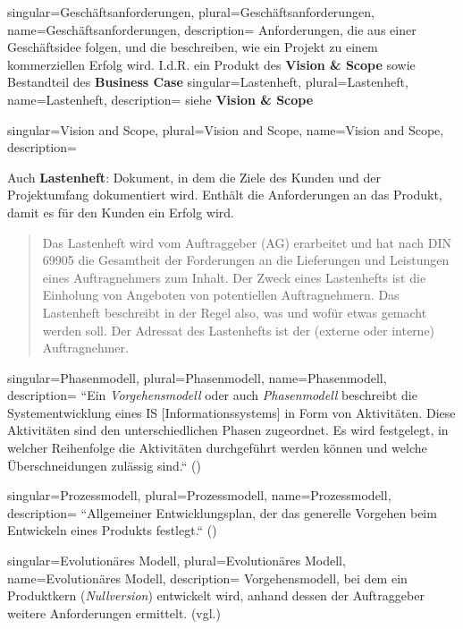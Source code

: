 {
singular={Geschäftsanforderungen},
plural={Geschäftsanforderungen},
name={Geschäftsanforderungen},
description={
Anforderungen, die aus einer Geschäftsidee folgen, und die beschreiben, wie ein Projekt zu einem kommerziellen Erfolg wird. I.d.R. ein Produkt des \textbf{Vision \& Scope} sowie Bestandteil des \textbf{Business Case}
}
}
{
singular={Lastenheft},
plural={Lastenheft},
name={Lastenheft},
description={
siehe \textbf{Vision \& Scope}
}
}


{
singular={Vision and Scope},
plural={Vision and Scope},
name={Vision and Scope},
description={
Auch \textbf{Lastenheft}: Dokument, in dem die Ziele des Kunden und der Projektumfang dokumentiert wird. Enthält die Anforderungen an das Produkt, damit es für den Kunden ein Erfolg wird.\\
\blockquote[{\cite[305]{AABG14m}}]{
Das Lastenheft wird vom Auftraggeber (AG) erarbeitet und hat
nach DIN 69905 die Gesamtheit der Forderungen an die Lieferungen und Leistungen eines Auftragnehmers zum Inhalt. Der Zweck eines Lastenhefts ist die Einholung von Angeboten von potentiellen Auftragnehmern. Das Lastenheft beschreibt
in der Regel also, was und wofür etwas gemacht werden soll. Der Adressat des
Lastenhefts ist der (externe oder interne) Auftragnehmer.
}


}
}


{
singular={Phasenmodell},
plural={Phasenmodell},
name={Phasenmodell},
description={
``Ein \textit{Vorgehensmodell} oder auch \textit{Phasenmodell} beschreibt die Systementwicklung
eines IS [Informationssystems] in Form von Aktivitäten. Diese Aktivitäten sind den unterschiedlichen
Phasen zugeordnet. Es wird festgelegt, in welcher Reihenfolge die Aktivitäten
durchgeführt werden können und welche Überschneidungen zulässig sind.`` (\cite[316]{AABG14n})
}
}

{
singular={Prozessmodell},
plural={Prozessmodell},
name={Prozessmodell},
description={
``Allgemeiner Entwicklungsplan, der das generelle Vorgehen beim Entwickeln eines Produkts festlegt.`` (\cite[694]{Bal08})
}
}

{
singular={Evolutionäres Modell},
plural={Evolutionäres Modell},
name={Evolutionäres Modell},
description={
Vorgehensmodell, bei dem ein Produktkern (\textit{Nullversion}) entwickelt wird, anhand dessen der Auftraggeber weitere Anforderungen ermittelt. (vgl.\cite[529 f.]{Bal08})
}
}

